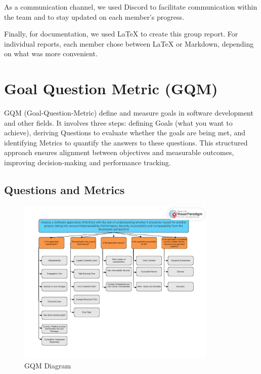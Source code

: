\documentclass[a4paper,11pt,openright,BCOR=15mm]{scrbook}
\begin{document}
	As a communication channel, we used Discord to facilitate communication within the team and to stay updated on each member's progress.
	
	Finally, for documentation, we used LaTeX to create this group report. For individual reports, each member chose between LaTeX or Markdown, depending on what was more convenient.
	
	
	\chapter{Goal Question Metric (GQM)}
		
	GQM (Goal-Question-Metric) define and measure goals in software development and other fields. It involves three steps: defining Goals (what you want to achieve), deriving Questions to evaluate whether the goals are being met, and identifying Metrics to quantify the answers to these questions. This structured approach ensures alignment between objectives and measurable outcomes, improving decision-making and performance tracking.
		
	\section{Questions and Metrics}
		
	\begin{figure}[H]
		\begin{center}
			\includegraphics[width=0.85\textwidth]{figs/GQM.png}
			\caption{GQM Diagram}
			\label{fig:GQM Diagram}
			\centering
		\end{center}
	\end{figure}
	
\end{document}
